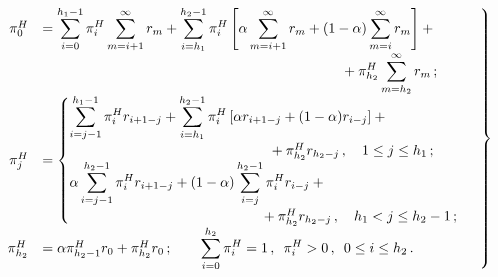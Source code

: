   \begin{equation}


  \hspace*{-5mm}\left.


  \begin{array}{rl}


  \pi_0^H &= \displaystyle \sum\limits_{i=0}^{h_1-1} \pi_i^H 


\sum\limits_{m=i+1}^\infty r_m +\sum\limits_{i=h_1}^{h_2-1} \pi_i^H \left[ \alpha 


\sum\limits_{m=i+1}^\infty r_m +(1-\alpha) \sum\limits_{m=i}^\infty r_m\right] 


+{}\\[6pt]


&\displaystyle\hspace*{75mm}{}+\pi^H_{h_2}\sum\limits_{m=h_2}^\infty r_m\,;\\[1pt]


  \pi_j^H &=


  \begin{cases}


  \displaystyle \sum\limits_{i=j-1}^{h_1-1} \pi_i^H r_{i+1-j} 


+\sum\limits_{i=h_1}^{h_2-1} \pi_i^H \left[ \alpha r_{i+1-j} +(1-\alpha) r_{i-


j}\right] +{}\\


\hspace*{50mm}{}+\pi^H_{h_2} r_{h_2-j}\,,\quad


1\leq j\leq h_1\,;\\


\displaystyle\alpha  \sum\limits_{i=j-1}^{h_2-1} \pi_i^H r_{i+1-j} 


+(1-\alpha) \sum\limits_{i=j}^{h_2-1} \pi_i^H r_{i-j} +{}\\


\hspace*{48mm}{}+\pi^H_{h_2} r_{h_2-


j}\,,\quad  h_1<j\leq h_2-1\,;\end{cases}\\[1pt]


  \pi^H_{h_2} &= \alpha \pi^H_{h_2-1} r_0 +\pi^H_{h_2} r_0\,; %


  \qquad


  \displaystyle \sum\limits_{i=0}^{h_2} \pi_i^H = 1\,,\enskip \pi_i^H>0\,,\enskip 


0\leq i\leq h_2\,.


  \end{array}


  \right\}\!\!


  \label{e6-ag}


  \end{equation}


